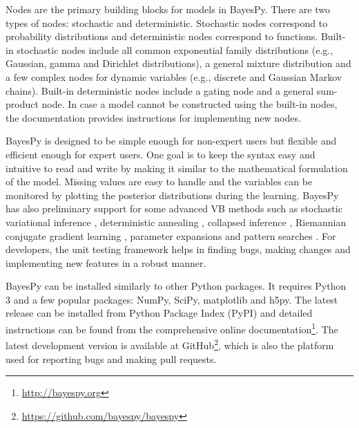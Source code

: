 \documentclass[twoside,11pt]{article}
\begin{document}
Nodes are the primary building blocks for models in BayesPy.  There are two
types of nodes: stochastic and deterministic.  Stochastic nodes correspond to
probability distributions and deterministic nodes correspond to functions.
Built-in stochastic nodes include all common exponential family distributions
(e.g., Gaussian, gamma and Dirichlet distributions), a general mixture
distribution and a few complex nodes for dynamic variables (e.g., discrete and
Gaussian Markov chains).  Built-in deterministic nodes include a gating node and
a general sum-product node.
In case a model cannot be constructed using the built-in nodes, the
documentation provides instructions for implementing new nodes.



BayesPy is designed to be simple enough for non-expert users but flexible and
efficient enough for expert users.  One goal is to keep the syntax easy and
intuitive to read and write by making it similar to the mathematical formulation
of the model.  Missing values are easy to handle and the variables can be
monitored by plotting the posterior distributions during the learning.  BayesPy
has also preliminary support for some advanced VB methods such as stochastic
variational inference \citep{Hoffman:2013}, deterministic annealing
\citep{Katahira:2008}, collapsed inference \citep{Hensman:2012}, Riemannian
conjugate gradient learning \citep{Honkela:2010}, parameter expansions
\citep{Qi:2007} and pattern searches \citep{Honkela:2003}.  For developers, the
unit testing framework helps in finding bugs, making changes and implementing
new features in a robust manner.



BayesPy can be installed similarly to other Python packages.  It requires Python
3 and a few popular packages: NumPy, SciPy, matplotlib and h5py.  The latest
release can be installed from Python Package Index (PyPI) and detailed
instructions can be found from the comprehensive online
documentation\footnote{\url{http://bayespy.org}}.  The latest development
version is available at
GitHub\footnote{\url{https://github.com/bayespy/bayespy}}, which is also the
platform used for reporting bugs and making pull requests.




\end{document}

